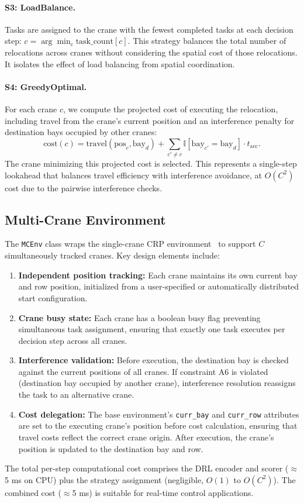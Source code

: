 \paragraph{S3: LoadBalance.} Tasks are assigned to the crane with the fewest completed tasks at each decision step: $c = \arg\min_c \text{task\_count}[c]$. This strategy balances the total number of relocations across cranes without considering the spatial cost of those relocations. It isolates the effect of load balancing from spatial coordination.

\paragraph{S4: GreedyOptimal.} For each crane $c$, we compute the projected cost of executing the relocation, including travel from the crane's current position and an interference penalty for destination bays occupied by other cranes:
\begin{equation}
    \text{cost}(c) = \text{travel}(\text{pos}_c, \text{bay}_d) + \sum_{c' \neq c} \mathbb{I}[\text{bay}_{c'} = \text{bay}_d] \cdot t_{\text{acc}}.
\end{equation}
The crane minimizing this projected cost is selected. This represents a single-step lookahead that balances travel efficiency with interference avoidance, at $O(C^2)$ cost due to the pairwise interference checks.

\subsection{Multi-Crane Environment}
\label{sec:mcenv}

The \texttt{MCEnv} class wraps the single-crane CRP environment~\cite{shin2026} to support $C$ simultaneously tracked cranes. Key design elements include:

\begin{enumerate}
    \item \textbf{Independent position tracking:} Each crane maintains its own current bay and row position, initialized from a user-specified or automatically distributed start configuration.
    \item \textbf{Crane busy state:} Each crane has a boolean busy flag preventing simultaneous task assignment, ensuring that exactly one task executes per decision step across all cranes.
    \item \textbf{Interference validation:} Before execution, the destination bay is checked against the current positions of all cranes. If constraint A6 is violated (destination bay occupied by another crane), interference resolution reassigns the task to an alternative crane.
    \item \textbf{Cost delegation:} The base environment's \texttt{curr\_bay} and \texttt{curr\_row} attributes are set to the executing crane's position before cost calculation, ensuring that travel costs reflect the correct crane origin. After execution, the crane's position is updated to the destination bay and row.
\end{enumerate}

The total per-step computational cost comprises the DRL encoder and scorer ($\approx$5 ms on CPU) plus the strategy assignment (negligible, $O(1)$ to $O(C^2)$). The combined cost ($\approx$5 ms) is suitable for real-time control applications.
